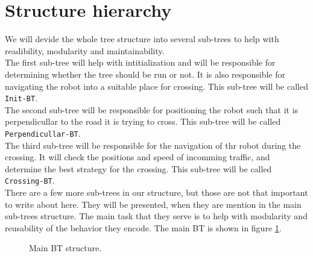 \section{Structure hierarchy}
    We will devide the whole tree structure into several sub-trees to help with readibility, modularity and maintainability.\\
    The first sub-tree will help with intitialization and will be responsible for determining whether the tree should be run or not. It is also responsible for navigating the robot into a suitable place for crossing. This sub-tree will be called \texttt{Init-BT}.\\
    The second sub-tree will be responsible for positioning the robot such that it is perpendicullar to the road it is trying to cross. This sub-tree will be called \texttt{Perpendicullar-BT}.\\
    The third sub-tree will be responsible for the navigation of thr robot during the crossing. It will check the positions and speed of incomming traffic, and determine the best strategy for the crossing. This sub-tree will be called \texttt{Crossing-BT}.\\
    There are a few more sub-trees in our structure, but those are not that important to write about here. They will be presented, when they are mention in the main sub-trees structure. The main task that they serve is to help with modularity and reusability of the behavior they encode.
    The main BT is shown in figure \ref{fig:main-BT}.
    \begin{figure}[ht]
        \caption{Main BT structure.}
        \label{fig:main-BT}
    \end{figure}


